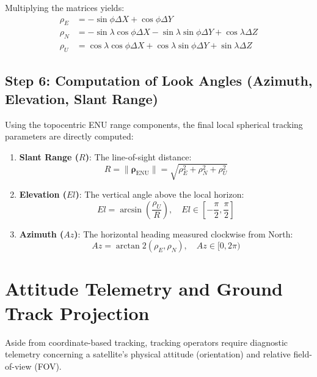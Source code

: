 \documentclass[11pt,journal,onecolumn]{IEEEtran}
\begin{document}
Multiplying the matrices yields:
\begin{equation}
\begin{aligned}
\rho_E &= -\sin\phi \Delta X + \cos\phi \Delta Y \\
\rho_N &= -\sin\lambda \cos\phi \Delta X - \sin\lambda \sin\phi \Delta Y + \cos\lambda \Delta Z \\
\rho_U &= \cos\lambda \cos\phi \Delta X + \cos\lambda \sin\phi \Delta Y + \sin\lambda \Delta Z
\end{aligned}
\label{eq:enu_components}
\end{equation}

\subsection{Step 6: Computation of Look Angles (Azimuth, Elevation, Slant Range)}
Using the topocentric ENU range components, the final local spherical tracking parameters are directly computed:
\begin{enumerate}
    \item \textbf{Slant Range ($R$)}: The line-of-sight distance:
    \begin{equation}
    R = \|\boldsymbol{\rho}_{\text{ENU}}\| = \sqrt{\rho_E^2 + \rho_N^2 + \rho_U^2}
    \label{eq:slant_range}
    \end{equation}
    
    \item \textbf{Elevation ($El$)}: The vertical angle above the local horizon:
    \begin{equation}
    El = \arcsin\left( \frac{\rho_U}{R} \right), \quad El \in \left[-\frac{\pi}{2}, \frac{\pi}{2}\right]
    \label{eq:elevation}
    \end{equation}
    
    \item \textbf{Azimuth ($Az$)}: The horizontal heading measured clockwise from North:
    \begin{equation}
    Az = \arctan2(\rho_E, \rho_N), \quad Az \in [0, 2\pi)
    \label{eq:azimuth}
    \end{equation}
\end{enumerate}

\section{Attitude Telemetry and Ground Track Projection}
Aside from coordinate-based tracking, tracking operators require diagnostic telemetry concerning a satellite's physical attitude (orientation) and relative field-of-view (FOV).
\end{document}
